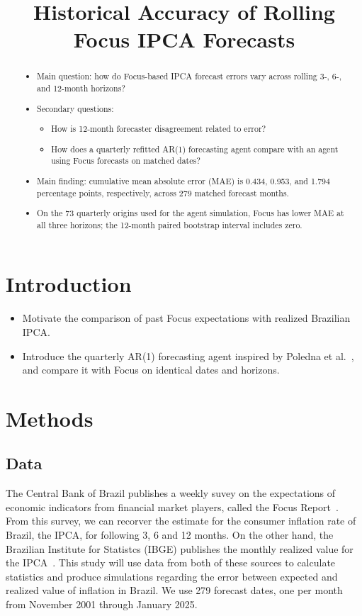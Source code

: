 \documentclass[11pt,a4paper]{article}
\title{Historical Accuracy of Rolling Focus IPCA Forecasts}
\author{}
\date{}
\begin{document}
\maketitle

\begin{abstract}
\begin{itemize}
  \item Main question: how do Focus-based IPCA forecast errors vary across rolling 3-, 6-, and 12-month horizons?
  \item Secondary questions: 
  \begin{itemize}
    \item How is 12-month forecaster disagreement related to error?
    \item How does a quarterly refitted AR(1) forecasting agent compare with an agent using Focus forecasts on matched dates?
  \end{itemize}
  \item Main finding: cumulative mean absolute error (MAE) is 0.434, 0.953, and 1.794 percentage points, respectively, across 279 matched forecast months.
  \item On the 73 quarterly origins used for the agent simulation, Focus has lower MAE at all three horizons; the 12-month paired bootstrap interval includes zero.
\end{itemize}
\end{abstract}

\section{Introduction}
\begin{itemize}
  \item Motivate the comparison of past Focus expectations with realized Brazilian IPCA.
  \item Introduce the quarterly AR(1) forecasting agent inspired by Poledna et al.~\cite{poledna2023}, and compare it with Focus on identical dates and horizons.
\end{itemize}

\section{Methods}

\subsection{Data}
The Central Bank of Brazil publishes a weekly suvey on the expectations of economic indicators from financial market players, called the Focus Report~\cite{bcbfocus}. From this survey, we can recorver the estimate for the consumer inflation rate of Brazil, the IPCA, for following 3, 6 and 12 months. On the other hand, the Brazilian Institute for Statistcs (IBGE) publishes the monthly realized value for the IPCA~\cite{ibgeipca}. This study will use data from both of these sources to calculate statistics and produce simulations regarding the error between expected and realized value of inflation in Brazil. We use 279 forecast dates, one per month from November 2001 through January 2025.
\end{document}
